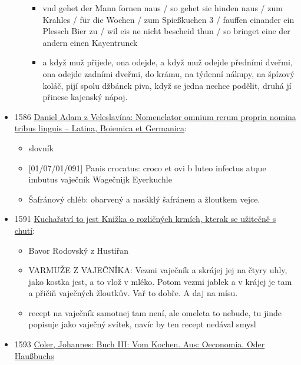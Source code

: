 \begin{itemize}
\begin{itemize}
    \begin{itemize}
    \tightlist
    \item
      vnd gehet der Mann fornen naus / so gehet sie hinden naus / zum
      Krahles / für die Wochen / zum Spießkuchen 3 / fauffen einander
      ein Plessch Bier zu / wil eis ne nicht bescheid thun / so bringet
      eine der andern einen Kayentrunck
    \item
      a když muž přijede, ona odejde, a když muž odejde předními dveřmi,
      ona odejde zadními dveřmi, do krámu, na týdenní nákupy, na špízový
      koláč, pijí spolu džbánek piva, když se jedna nechce podělit,
      druhá jí přinese kajenský nápoj.
    \end{itemize}
  \end{itemize}
\item
  1586
  \href{https://bara.ujc.cas.cz/slovniky/velnom/velnom7.html\#CTX1229}{Daniel
  Adam z Veleslavína: Nomenclator omnium rerum propria nomina tribus
  linguis -- Latina, Boiemica et Germanica}:

  \begin{itemize}
  \tightlist
  \item
    slovník
  \item
    {[}01/07/01/091{]} Panis crocatus: croco et ovi b luteo infectus
    atque imbutus \textbar{} vaječník \textbar{} Wagečnijk \textbar{}
    Eyerkuchle
  \item
    Šafránový chléb: obarvený a nasáklý šafránem a žloutkem vejce.
  \end{itemize}
\item
  1591
  \href{https://ndk.cz/uuid/uuid:27bccb70-88d6-11e3-997d-005056827e52}{Kuchařství
  to jest Knižka o rozličných krmích, kterak se užitečně s chutí}:

  \begin{itemize}
  \tightlist
  \item
    Bavor Rodovský z Hustiřan
  \item
    VARMUŽE Z VAJEČNÍKA: Vezmi vaječník a skrájej jej na čtyry uhly,
    jako kostka jest, a to vlož v mléko. Potom vezmi jablek a v krájej
    je tam a přičiň vaječných žloutkův. Vař to dobře. A daj na mísu.
  \item
    recept na vaječník samotnej tam není, ale omeleta to nebude, tu
    jinde popisuje jako vaječný svítek, navíc by ten recept nedával
    smysl
  \end{itemize}
\item
  1593
  \href{https://www.deutschestextarchiv.de/book/view/coler_kochbuch_1593/?hl=Spi\%C3\%9Fkuchen&p=85}{Coler,
  Johannes: Buch III: Vom Kochen. Aus: Oeconomia. Oder Haußbuchs}


\end{itemize}
